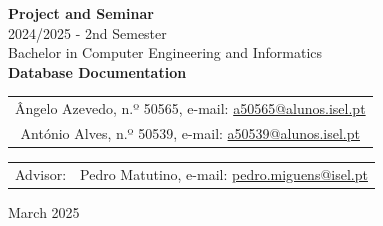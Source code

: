 \documentclass[a4paper,twoside,11pt]{article}
\begin{document}
\begin{titlepage}
\begin{center}


\vspace{1cm}

{\Large \textbf{Project and Seminar}\\}
\vspace{0.3cm}
{\Large 2024/2025 - 2nd Semester\\}
\vspace{0.8cm}
{\Large Bachelor in Computer Engineering and Informatics\\}
\vspace{1cm}
{\Huge \textbf{Database Documentation}\\}
\vspace{2cm}

\begin{tabular}{c}
    Ângelo Azevedo, n.º 50565, e-mail: \href{mailto:a50565@alunos.isel.pt}{a50565@alunos.isel.pt}\\
    António Alves, n.º 50539, e-mail: \href{mailto:a50539@alunos.isel.pt}{a50539@alunos.isel.pt}\\
\end{tabular}

\vspace{2cm}

\begin{tabular}{ll}
    {Advisor:} & Pedro Matutino, e-mail: \href{mailto:pedro.miguens@isel.pt}{pedro.miguens@isel.pt} \\
\end{tabular}

\vspace{1cm}

March 2025

\end{center}
\end{titlepage}
\end{document}
